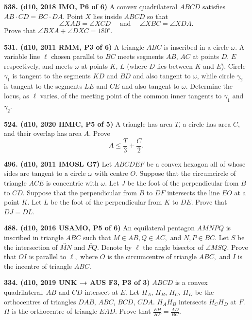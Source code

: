 \documentclass{article}
\begin{document}
\textbf{538. (\color{red}d10\color{black}, 2018 IMO, P6 of 6)} A convex quadrilateral $ABCD$ satisfies $AB\cdot CD = BC\cdot DA$. Point $X$ lies inside $ABCD$ so that\[\angle{XAB} = \angle{XCD}\quad\,\,\text{and}\quad\,\,\angle{XBC} = \angle{XDA}.\]Prove that $\angle{BXA} + \angle{DXC} = 180^\circ$.

\textbf{531. (\color{red}d10\color{black}, 2011 RMM, P3 of 6)} A triangle $ABC$ is inscribed in a circle $\omega$.
A variable line $\ell$ chosen parallel to $BC$ meets segments $AB$, $AC$ at points $D$, $E$ respectively, and meets $\omega$ at points $K$, $L$ (where $D$ lies between $K$ and $E$).
Circle $\gamma_1$ is tangent to the segments $KD$ and $BD$ and also tangent to $\omega$, while circle $\gamma_2$ is tangent to the segments $LE$ and $CE$ and also tangent to $\omega$.
Determine the locus, as $\ell$ varies, of the meeting point of the common inner tangents to $\gamma_1$ and $\gamma_2$.

\textbf{524. (\color{red}d10\color{black}, 2020 HMIC, P5 of 5)} A triangle has area $T$, a circle has area $C$, and their overlap has area $A$. Prove $$A \leq \frac T3 + \frac C2.$$

\textbf{496. (\color{red}d10\color{black}, 2011 IMOSL G7)} Let $ABCDEF$ be a convex hexagon all of whose sides are tangent to a circle $\omega$ with centre $O$. Suppose that the circumcircle of triangle $ACE$ is concentric with $\omega$. Let $J$ be the foot of the perpendicular from $B$ to $CD$. Suppose that the perpendicular from $B$ to $DF$ intersects the line $EO$ at a point $K$. Let $L$ be the foot of the perpendicular from $K$ to $DE$. Prove that $DJ=DL$.

\textbf{488. (\color{red}d10\color{black}, 2016 USAMO, P5 of 6)} An equilateral pentagon $AMNPQ$ is inscribed in triangle $ABC$ such that $M \in \overline{AB}, Q \in \overline{AC},$ and $N, P \in \overline{BC}.$ Let $S$ be the intersection of $\overleftrightarrow{MN}$ and $\overleftrightarrow{PQ}.$ Denote by $\ell$ the angle bisector of $\angle MSQ.$
Prove that $\overline{OI}$ is parallel to $\ell,$ where $O$ is the circumcentre of triangle $ABC,$ and $I$ is the incentre of triangle $ABC.$

\textbf{334. (\color{red}d10\color{black}, 2019 UNK → AUS F3, P3 of 3)} $ABCD$ is a convex quadrilateral. $AB$ and $CD$ intersect at $E$. Let $H_A$, $H_B$, $H_C$, $H_D$ be the orthocentres of triangles $DAB$, $ABC$, $BCD$, $CDA$. $H_AH_B$ intersects $H_CH_D$ at $F$. $H$ is the orthocentre of triangle $EAD$. Prove that $\frac{EH}{HF} = \frac{AD}{BC}$.
\end{document}
